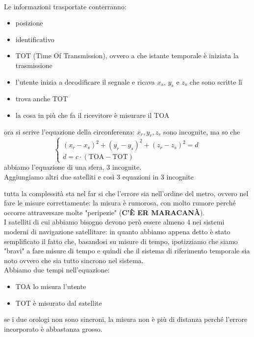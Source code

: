 \documentclass[oneside, 12pt]{extbook}
\begin{document}
\begin{itemize}
\begin{figure}[!h]
	\end{figure}\\
	Le informazioni trasportate conterranno:
	\begin{itemize}
		\item posizione
		\item identificativo
		\item TOT (Time Of Transmission), ovvero a che istante temporale è iniziata la trasmissione
	\end{itemize}
	\begin{itemize}
		\item l'utente inizia a decodificare il segnale e ricava $x_s$, $y_s$ e $z_s$ che sono scritte lì
		\item trova anche TOT
		\item la cosa in più che fa il ricevitore è misurare il TOA
	\end{itemize}
	ora si scrive l'equazione della circonferenza: $x_r, y_r, z_r$ sono incognite, ma so che
	\[
		\begin{cases}
			(x_r - x_s)^2 + (y_r - y_s)^2 + (z_r - z_s)^2 = d \\
			d = c \cdot (\text{TOA} - \text{TOT})
		\end{cases}
	\]
	abbiamo l'equazione di una sfera, 3 incognite.\\Aggiungiamo altri due satelliti e così 3 equazioni in 3 incognite
\end{itemize}
tutta la complessità sta nel far si che l'errore sia nell'ordine del metro, ovvero nel fare le misure correttamente: la misura è rumorosa, con molto rumore perché occorre attraversare molte "peripezie" (\textbf{C'È ER MARACANÀ}).\\
I satelliti di cui abbiamo bisogno devono però essere almeno 4 nei sistemi moderni di navigazione satellitare: in quanto abbiamo appena detto è stato semplificato il fatto che, basandosi su misure di tempo, ipotizziamo che siamo "bravi" a fare misure di tempo e quindi che il sistema di riferimento temporale sia noto ovvero che sia tutto sincrono nel sistema.\\
Abbiamo due tempi nell'equazione:
\begin{itemize}
	\item TOA lo misura l'utente
	\item TOT è misurato dal satellite
\end{itemize}
se i due orologi non sono sincroni, la misura non è più di distanza perché l'errore incorporato è abbastanza grosso.\\
\end{document}
